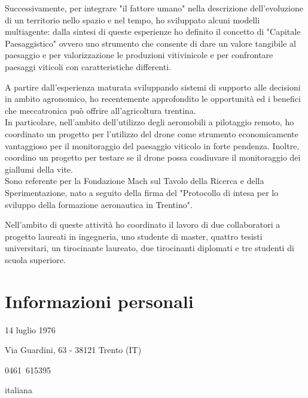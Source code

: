 \documentclass{curriculum}
\begin{document}
\begin{description}[style= unboxed, leftmargin= 6 pt, topsep= -3 pt, parsep= 3 pt, itemsep= 2pt]
     Successivamente, per integrare "il fattore umano" nella descrizione dell'evoluzione di un territorio nello spazio e nel tempo, ho sviluppato alcuni modelli multiagente: dalla sintesi di queste esperienze ho definito il concetto  di "Capitale Paesaggistico" ovvero uno strumento che consente di dare un valore tangibile al paesaggio e per valorizzazione le produzioni vitivinicole e per confrontare paesaggi viticoli con caratteristiche differenti. 
     \item[Droni e agricoltura di precisone] A partire dall'esperienza maturata sviluppando sistemi di supporto alle decisioni in ambito agronomico, ho recentemente approfondito le opportunità ed i benefici che meccatronica può offrire all'agricoltura trentina.\\In particolare, nell'ambito dell'utilizzo degli aeromobili a pilotaggio remoto, ho coordinato un progetto per l'utilizzo del drone come strumento economicamente vantaggioso per il monitoraggio del paesaggio viticolo in forte pendenza. Inoltre, coordino un progetto per testare se il drone possa coadiuvare il monitoraggio dei giallumi della vite.\\
     Sono referente per la Fondazione Mach sul Tavolo della Ricerca e della Sperimentazione, nato a seguito della firma del "Protocollo di intesa per lo sviluppo della formazione aeronautica in Trentino".
    \end{description}
    \vspace{3pt}
    Nell'ambito di queste attività ho coordinato il lavoro di due collaboratori a progetto laureati in ingegneria, uno studente di master, quattro tesisti universitari, un tirocinante laureato, due tirocinanti diplomati e tre studenti di scuola superiore.
    
    \newpage
    
    \section{Informazioni personali}
    \begin{description}[style= unboxed, leftmargin= 6 pt, topsep= -3 pt, parsep= 3 pt, itemsep= 2pt]
        \item[Data di nascita:] 14 luglio 1976
        \item[Indirizzo:] Via Guardini, 63 - 38121 Trento (IT)
        \item[Telefono:] 0461~615395
        \item[Nazionalità:] italiana
    \end{description}
    
\end{document}
